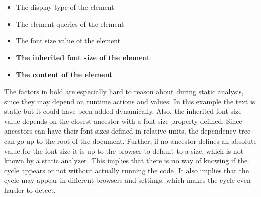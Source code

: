 \documentclass[a4paper,11pt]{kth-mag}
\newcommand{\code}[1]{\texttt{#1}}
\begin{document}
        \begin{itemize}
          \item The display type of the \gls{element}
          \item The \gls{element} queries of the \gls{element}
          \item The font size value of the \gls{element}
          \item \textbf{The inherited font size of the \gls{element}}
          \item \textbf{The content of the \gls{element}}
        \end{itemize}
        The factors in bold are especially hard to reason about during static analysis, since they may depend on runtime actions and values.
        In this example the text is static but it could have been added dynamically.
        Also, the inherited font size value depends on the closest ancestor with a font size property defined.
        Since ancestors can have their font sizes defined in relative units, the dependency tree can go up to the root of the \gls{document}.
        Further, if no ancestor defines an absolute value for the font size it is up to the \gls{browser} to default to a size, which is not known by a static analyzer.
        This implies that there is no way of knowing if the cycle appears or not without actually running the code.
        It also implies that the cycle may appear in different \glspl{browser} and settings, which makes the cycle even harder to detect.

\end{document}
